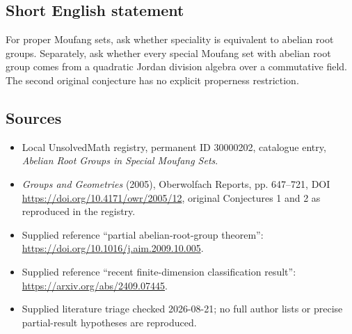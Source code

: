 \documentclass[11pt]{article}
\begin{document}
\subsection{Short English statement}
For proper Moufang sets, ask whether speciality is equivalent to abelian root groups. Separately, ask whether every special Moufang set with abelian root group comes from a quadratic Jordan division algebra over a commutative field. The second original conjecture has no explicit properness restriction.
\subsection{Sources}
\begin{itemize}
\item Local UnsolvedMath registry, permanent ID 30000202, catalogue entry, \emph{Abelian Root Groups in Special Moufang Sets}.
\item \emph{Groups and Geometries} (2005), Oberwolfach Reports, pp. 647--721, DOI \url{https://doi.org/10.4171/owr/2005/12}, original Conjectures 1 and 2 as reproduced in the registry.
\item Supplied reference ``partial abelian-root-group theorem'': \url{https://doi.org/10.1016/j.aim.2009.10.005}.
\item Supplied reference ``recent finite-dimension classification result'': \url{https://arxiv.org/abs/2409.07445}.
\item Supplied literature triage checked 2026-08-21; no full author lists or precise partial-result hypotheses are reproduced.
\end{itemize}
\end{document}
